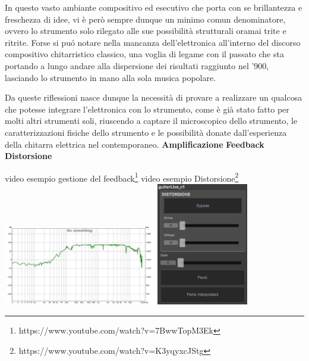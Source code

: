 \documentclass[oneside]{article}
\begin{document}
\begin{multicols*}{2}
In questo vasto ambiante compositivo ed esecutivo che porta con se brillantezza e freschezza di idee, vi è però sempre dunque un minimo comun denominatore, ovvero lo strumento solo rilegato alle sue possibilità strutturali oramai trite e ritrite. Forse si puó notare nella mancanza dell'elettronica all'interno del discorso compositivo chitarristico classico, una voglia di legame con il passato che sta portando a lungo andare alla dispersione dei risultati raggiunto nel '900, lasciando lo strumento in mano alla sola musica popolare. 

\noindent Da queste riflessioni nasce dunque la necessità di provare a realizzare un qualcosa che potesse integrare l'elettronica con lo strumento, come è già stato fatto per molti altri strumenti soli, riuscendo a captare il microscopico dello strumento, le caratterizzazioni fisiche dello strumento e le possibilità donate dall'esperienza della chitarra elettrica nel contemporaneo.
\noindent
\newline
\textbf{Amplificazione} \newline
\textbf{Feedback} \newline
\textbf{Distorsione} \newline

video esempio gestione del feedback\footnote{https://www.youtube.com/watch?v=7BwwTopM3Ek}
video esempio Distorsione\footnote{https://www.youtube.com/watch?v=K3yqyxcJStg}
\includegraphics[width=0.5\textwidth]{img/ir.png}
\includegraphics[width=0.3\textwidth]{img/guitarLive.png}



\end{multicols*}
\end{document}
